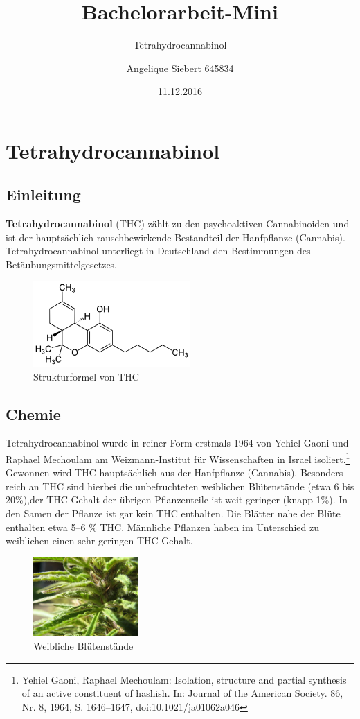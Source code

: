 \documentclass[openany]{scrbook}
\title{Bachelorarbeit-Mini}
\subtitle{Tetrahydrocannabinol}
\author{Angelique Siebert 645834}
\date{11.12.2016}
\begin{document}
	\maketitle
	\tableofcontents

	\chapter
	{Tetrahydrocannabinol}
	\section{Einleitung}
	\textbf{Tetrahydrocannabinol} (THC) zählt zu den psychoaktiven Cannabinoiden und ist der hauptsächlich rauschbewirkende Bestandteil der Hanfpflanze (Cannabis). Tetrahydrocannabinol unterliegt in Deutschland den Bestimmungen des Betäubungsmittelgesetzes.
	
\begin{figure}[h]
	\centering
	\includegraphics[width=6cm]{abb1}
	\caption{Strukturformel von THC}
	\label{fig:THC}
\end{figure}

\section{Chemie}
	Tetrahydrocannabinol wurde in reiner Form erstmals 1964 von Yehiel Gaoni und Raphael Mechoulam am Weizmann-Institut für Wissenschaften in Israel isoliert.\footnote[1]{ Yehiel Gaoni, Raphael Mechoulam: Isolation, structure and partial synthesis of an active constituent of hashish. In: Journal of the American Society. 86, Nr. 8, 1964, S. 1646–1647, doi:10.1021/ja01062a046} Gewonnen wird THC hauptsächlich aus der Hanfpflanze (Cannabis). Besonders reich an THC sind hierbei die unbefruchteten weiblichen Blütenstände (etwa 6 bis 20\%),der THC-Gehalt der übrigen Pflanzenteile ist weit geringer (knapp 1\%). In den Samen der Pflanze ist gar kein THC enthalten. Die Blätter nahe der Blüte enthalten etwa 5–6 \% THC. Männliche Pflanzen haben im Unterschied zu weiblichen einen sehr geringen THC-Gehalt. 
	
\begin{figure}[h]
	\centering
	\includegraphics[width=4cm]{abb2}
	\caption{Weibliche Blütenstände}
	\label{fig:Fe}
\end{figure}
\end{document}

